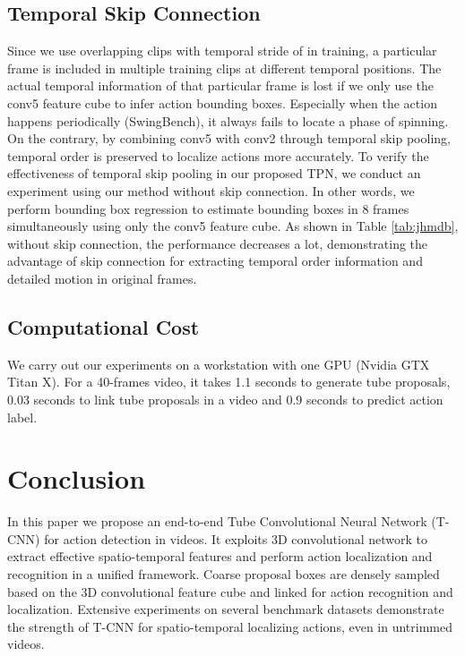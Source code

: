 \documentclass[10pt,twocolumn,letterpaper]{article}
\begin{document}
\subsection{Temporal Skip Connection}
Since we use overlapping clips with temporal stride of  in training, a particular frame is included in multiple training clips at different temporal positions. The actual temporal information of that particular frame is lost if we only use the conv5 feature cube to infer action bounding boxes. Especially when the action happens periodically (\ie SwingBench), it always fails to locate a phase of spinning. On the contrary, by combining conv5 with conv2 through temporal skip pooling, temporal order is preserved to localize actions more accurately. To verify the effectiveness of temporal skip pooling in our proposed TPN, we conduct an experiment using our method without skip connection. In other words, we perform bounding box regression to estimate bounding boxes in 8 frames simultaneously using only the conv5 feature cube. As shown in Table \ref{tab:jhmdb}, without skip connection, the performance decreases a lot, demonstrating the advantage of skip connection for extracting temporal order information and detailed motion in original frames.




\subsection{Computational Cost}
We carry out our experiments on a workstation with one GPU (Nvidia GTX Titan X). For a 40-frames video, it takes 1.1 seconds to generate tube proposals, 0.03 seconds to link tube proposals in a video and 0.9 seconds to predict action label.


\section{Conclusion}
\label{sec:conclusion}
In this paper we propose an end-to-end Tube Convolutional Neural Network (T-CNN) for action detection in videos. It exploits 3D convolutional network to extract effective spatio-temporal features and perform action localization and recognition in a unified framework. Coarse proposal boxes are densely sampled based on the 3D convolutional feature cube and linked for action recognition and localization.  Extensive experiments on several benchmark datasets demonstrate the strength of T-CNN for spatio-temporal localizing actions, even in untrimmed videos.
\end{document}
